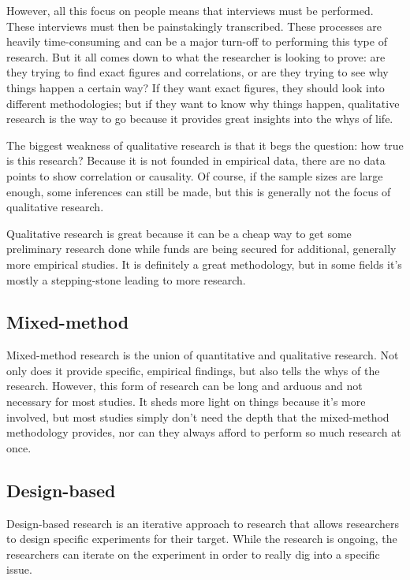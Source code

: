 \documentclass[man,natbib]{apa6}
\begin{document}
However, all this focus on people means that interviews must be performed. These interviews must then be painstakingly transcribed. These processes are heavily time-consuming and can be a major turn-off to performing this type of research. But it all comes down to what the researcher is looking to prove: are they trying to find exact figures and correlations, or are they trying to see why things happen a certain way? If they want exact figures, they should look into different methodologies; but if they want to know why things happen, qualitative research is the way to go because it provides great insights into the whys of life.

The biggest weakness of qualitative research is that it begs the question: how true is this research? Because it is not founded in empirical data, there are no data points to show correlation or causality. Of course, if the sample sizes are large enough, some inferences can still be made, but this is generally not the focus of qualitative research.

Qualitative research is great because it can be a cheap way to get some preliminary research done while funds are being secured for additional, generally more empirical studies. It is definitely a great methodology, but in some fields it's mostly a stepping-stone leading to more research.

\subsection{Mixed-method}
Mixed-method research is the union of quantitative and qualitative research. Not only does it provide specific, empirical findings, but also tells the whys of the research. However, this form of research can be long and arduous and not necessary for most studies. It sheds more light on things because it's more involved, but most studies simply don't need the depth that the mixed-method methodology provides, nor can they always afford to perform so much research at once.

\subsection{Design-based}
Design-based research is an iterative approach to research that allows researchers to design specific experiments for their target. While the research is ongoing, the researchers can iterate on the experiment in order to really dig into a specific issue.
\end{document}
